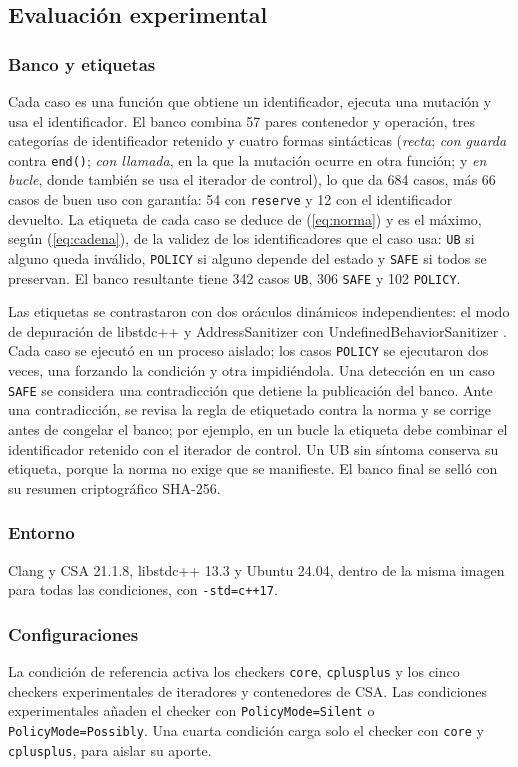 \documentclass[conference]{IEEEtran}
\newcommand{\code}[1]{\texttt{#1}}
\begin{document}
\subsection{Evaluación experimental}

\subsubsection{Banco y etiquetas}
Cada caso es una función que obtiene un identificador, ejecuta una mutación y usa el identificador. El banco combina 57 pares contenedor y operación, tres categorías de identificador retenido y cuatro formas sintácticas (\textit{recta}; \textit{con guarda} contra \code{end()}; \textit{con llamada}, en la que la mutación ocurre en otra función; y \textit{en bucle}, donde también se usa el iterador de control), lo que da 684 casos, más 66 casos de buen uso con garantía: 54 con \code{reserve} y 12 con el identificador devuelto. La etiqueta de cada caso se deduce de (\ref{eq:norma}) y es el máximo, según (\ref{eq:cadena}), de la validez de los identificadores que el caso usa: \code{UB} si alguno queda inválido, \code{POLICY} si alguno depende del estado y \code{SAFE} si todos se preservan. El banco resultante tiene 342 casos \code{UB}, 306 \code{SAFE} y 102 \code{POLICY}.

Las etiquetas se contrastaron con dos oráculos dinámicos independientes: el modo de depuración de libstdc++ \cite{libstdcxx} y AddressSanitizer con UndefinedBehaviorSanitizer \cite{asan}. Cada caso se ejecutó en un proceso aislado; los casos \code{POLICY} se ejecutaron dos veces, una forzando la condición y otra impidiéndola. Una detección en un caso \code{SAFE} se considera una contradicción que detiene la publicación del banco. Ante una contradicción, se revisa la regla de etiquetado contra la norma y se corrige antes de congelar el banco; por ejemplo, en un bucle la etiqueta debe combinar el identificador retenido con el iterador de control. Un UB sin síntoma conserva su etiqueta, porque la norma no exige que se manifieste. El banco final se selló con su resumen criptográfico SHA-256.

\subsubsection{Entorno}
Clang y CSA 21.1.8, libstdc++ 13.3 y Ubuntu 24.04, dentro de la misma imagen para todas las condiciones, con \code{-std=c++17}.

\subsubsection{Configuraciones}
La condición de referencia activa los checkers \code{core}, \code{cplusplus} y los cinco checkers experimentales de iteradores y contenedores de CSA. Las condiciones experimentales añaden el checker con \code{PolicyMode=Silent} o \code{PolicyMode=Possibly}. Una cuarta condición carga solo el checker con \code{core} y \code{cplusplus}, para aislar su aporte.
\end{document}
